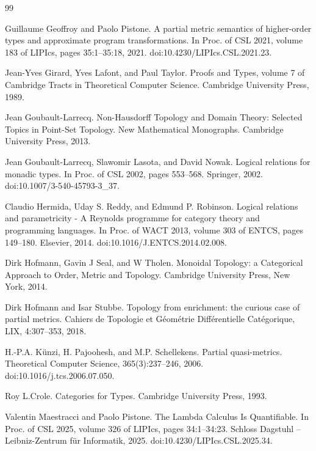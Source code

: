 \documentclass[10pt,a4paper]{amsart}
\begin{document}
\begin{thebibliography}{99}
\par\noindent  [17]  Guillaume Geoffroy and Paolo Pistone.  A partial metric semantics of higher-order types and approximate program transformations.  In Proc. of CSL 2021, volume 183 of LIPIcs, pages 35:1–35:18, 2021.  doi:10.4230/LIPIcs.CSL.2021.23.  
 
\par\noindent  [18]  Jean-Yves Girard, Yves Lafont, and Paul Taylor.  Proofs and Types, volume 7 of Cambridge Tracts in Theoretical Computer Science.  Cambridge University Press, 1989.  
 
\par\noindent  [19]  Jean Goubault-Larrecq.  Non-Hausdorff Topology and Domain Theory: Selected Topics in Point-Set Topology.  New Mathematical Monographs. Cambridge University Press, 2013.  
 
\par\noindent  [20]  Jean Goubault-Larrecq, Slawomir Lasota, and David Nowak.  Logical relations for monadic types.  In Proc. of CSL 2002, pages 553–568. Springer, 2002.  doi:10.1007/3-540-45793-3\_37.  
 
\par\noindent  [21]  Claudio Hermida, Uday S. Reddy, and Edmund P. Robinson.  Logical relations and parametricity - A Reynolds programme for category theory and programming languages.  In Proc. of WACT 2013, volume 303 of ENTCS, pages 149–180. Elsevier, 2014.  doi:10.1016/J.ENTCS.2014.02.008.  
 
\par\noindent  [22]  Dirk Hofmann, Gavin J Seal, and W Tholen.  Monoidal Topology: a Categorical Approach to Order, Metric and Topology.  Cambridge University Press, New York, 2014.  
 
\par\noindent  [23]  Dirk Hofmann and Isar Stubbe.  Topology from enrichment: the curious case of partial metrics.  Cahiers de Topologie et Géométrie Différentielle Catégorique, LIX, 4:307–353, 2018.  
 
\par\noindent  [24]  H.-P.A. Künzi, H. Pajoohesh, and M.P. Schellekens.  Partial quasi-metrics.  Theoretical Computer Science, 365(3):237–246, 2006.  doi:10.1016/j.tcs.2006.07.050.  
 
\par\noindent  [25]  Roy L.Crole.  Categories for Types.  Cambridge University Press, 1993.  
 
\par\noindent  [26]  Valentin Maestracci and Paolo Pistone.  The Lambda Calculus Is Quantifiable.  In Proc. of CSL 2025, volume 326 of LIPIcs, pages 34:1–34:23. Schloss Dagstuhl – Leibniz-Zentrum für Informatik, 2025.  doi:10.4230/LIPIcs.CSL.2025.34.  
 

\end{thebibliography}
\end{document}

